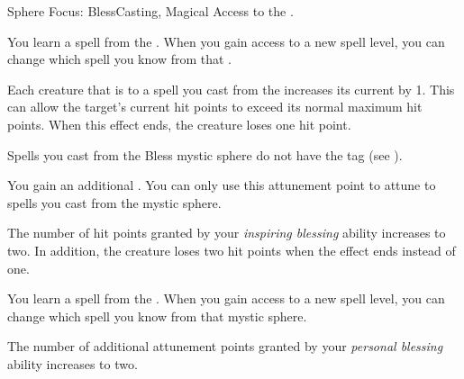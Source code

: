     \begin{feat}{Sphere Focus: Bless}{Casting, Magical}
        \featpre Access to the  .

         You learn a spell from the  .
        When you gain access to a new spell level, you can change which spell you know from that .

         Each creature that is  to a spell you cast from the   increases its current  by 1.
        This can allow the target's current hit points to exceed its normal maximum hit points.
        When this effect ends, the creature loses one hit point.

         Spells you cast from the Bless mystic sphere do not have the  tag (see ).

         You gain an additional .
        You can only use this attunement point to attune to spells you cast from the  mystic sphere.

         The number of hit points granted by your \textit{inspiring blessing} ability increases to two.
        In addition, the creature loses two hit points when the effect ends instead of one.

         You learn a spell from the  .
        When you gain access to a new spell level, you can change which spell you know from that mystic sphere.

         The number of additional attunement points granted by your \textit{personal blessing} ability increases to two.
    \end{feat}

